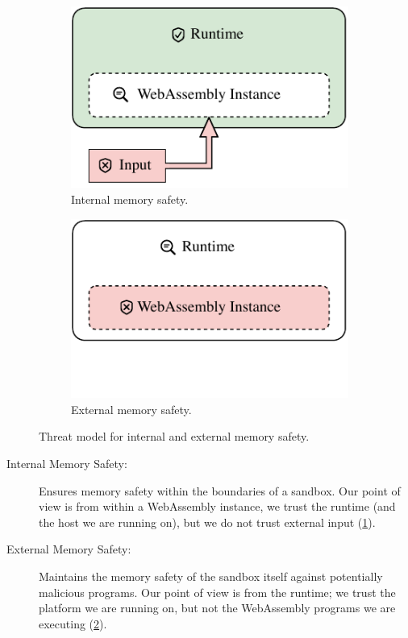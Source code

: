 \begin{figure}
    \centering
    \begin{subfigure}[T]{0.45\textwidth}
        \centering
        \includegraphics{figures/build/wasm-internal-mem-safety}
        \caption{Internal memory safety.}
        \label{fig:internal-mem-safety}
    \end{subfigure}
    \hfill
    \begin{subfigure}[T]{0.45\textwidth}
        \centering
        \includegraphics{figures/build/wasm-external-mem-safety}
        \hspace{\fill}
        \caption{External memory safety.}
        \label{fig:external-mem-safety}
    \end{subfigure}
    \caption{Threat model for internal and external memory safety.}
    \label{fig:threat-model}
\end{figure}

\begin{description}
    \item[Internal Memory Safety:] Ensures memory safety within the boundaries of a sandbox.
    Our point of view is from within a WebAssembly instance, we trust the runtime (and the host we are running on), but we do not trust external input (\cref{fig:internal-mem-safety}).
    \item[External Memory Safety:] Maintains the memory safety of the sandbox itself against potentially malicious programs.
    Our point of view is from the runtime; we trust the platform we are running on, but not the WebAssembly programs we are executing (\cref{fig:external-mem-safety}).
\end{description}

